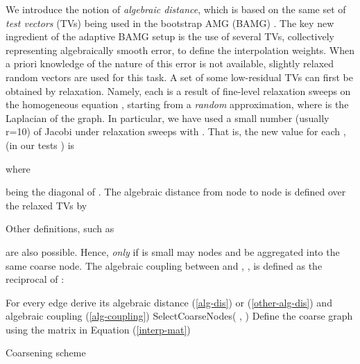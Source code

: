 \documentclass[final]{siamltex}
\begin{document}
\par We introduce the notion of {\it algebraic distance}, which is
based on the same set of {\it test vectors} (TVs) being used in the
bootstrap AMG (BAMG) \cite{amg}. The key new ingredient of the
adaptive BAMG setup is the use of several TVs, collectively
representing algebraically smooth error, to define the
interpolation weights. When a priori knowledge of the nature of
this error is not available, slightly relaxed random vectors are
used for this task. A set of some  low-residual TVs
 can first be obtained by relaxation.
Namely, each  is a result of  fine-level
relaxation sweeps on the homogeneous equation , starting
from a {\it random} approximation, where  is the Laplacian of
the graph. In particular, we have used a small number (usually r=10)
of Jacobi under relaxation sweeps with . That is, the
new value for each ,  (in our tests ) is

where

 being the diagonal of . The
algebraic distance from node  to node  is defined over the
 relaxed TVs by

Other definitions, such as

are also possible.
Hence, {\it only} if  is small may nodes  and  be
aggregated into the same coarse node. The algebraic coupling
between  and , , is defined as the reciprocal of
:

\begin{algorithm}
\SetLine \KwData{ , } 

For every edge  derive its algebraic distance 
(\ref{alg-dis}) or (\ref{other-alg-dis}) and algebraic coupling 
(\ref{alg-coupling})\; SelectCoarseNodes( , )\; Define the
coarse graph using the matrix  in Equation (\ref{interp-mat})\;
\caption{Coarsening scheme}\label{alg-gen-coarsening}
\end{algorithm}
\end{document}
